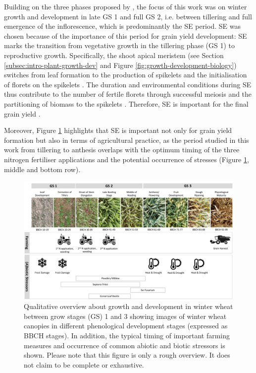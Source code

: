 Building on the three phases proposed by \cite{kirby_analysis_1988}, the focus of this work was on winter growth and development in late \gls{GS} 1 and full \gls{GS} 2, i.e. between tillering and full emergence of the inflorescence, which is predominantly the \gls{SE} period. \gls{SE} was chosen because of the importance of this period for grain yield development: \gls{SE} marks the transition from vegetative growth in the tillering phase (\gls{GS} 1) to reproductive growth. Specifically, the shoot apical meristem (see Section \ref{subsec:intro-plant-growth-dev} and Figure \ref{fig:growth-development-biology}) switches from leaf formation to the production of spikelets and the initialisation of florets on the spikelets \citep{mcmaster_simulating_1992}. The duration and environmental conditions during \gls{SE} thus contribute to the number of fertile florets through successful meiosis \citep{villegas_daylength_2016} and the partitioning of biomass to the spikelets \citep{gonzalez_grain_2003}. Therefore, \gls{SE} is important for the final grain yield \citep{fischer_yield_1975,fischer_wheat_2011}.

Moreover, Figure \ref{fig:ww-growth-qualitative} highlights that \gls{SE} is important not only for grain yield formation but also in terms of agricultural practice, as the period studied in this work from tillering to anthesis overlaps with the optimum timing of the three nitrogen fertiliser applications \citep{lewis_effect_1938} and the potential occurrence of stresses (Figure \ref{fig:ww-growth-qualitative}, middle and bottom row).

\begin{figure}[H]
    \centering
    \includegraphics[width=\textwidth]{01-Introduction/img/wheat_developement.pdf}
    \caption{Qualitative overview about growth and development in winter wheat between grow stages (GS) 1 and 3 showing images of winter wheat canopies in different phenological development stages (expressed as \gls{BBCH} stages). In addition, the typical timing of important farming measures and occurrence of common abiotic and biotic stressors is shown. Please note that this figure is only a rough overview. It does not claim to be complete or exhaustive.}
    \label{fig:ww-growth-qualitative}
\end{figure}

